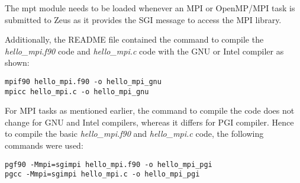 The mpt module needs to be loaded whenever an MPI or OpenMP/MPI task is submitted to Zeus as it provides the SGI message to access the MPI library.

Additionally, the README file contained the command to compile the \emph{hello\_mpi.f90} code and \emph{hello\_mpi.c} code with the 
GNU or Intel compiler as shown:

\begin{tcolorbox}
\begin{Verbatim}[fontsize=\scriptsize]
mpif90 hello_mpi.f90 -o hello_mpi_gnu
mpicc hello_mpi.c -o hello_mpi_gnu
\end{Verbatim}
\end{tcolorbox}

For MPI tasks as mentioned earlier, the command to compile the code does not change for GNU and Intel compilers, whereas it differs for PGI compiler.
Hence to compile the basic \emph{hello\_mpi.f90} and \emph{hello\_mpi.c} code, the following commands were used:

\begin{tcolorbox}
\begin{Verbatim}[fontsize=\scriptsize]
pgf90 -Mmpi=sgimpi hello_mpi.f90 -o hello_mpi_pgi
pgcc -Mmpi=sgimpi hello_mpi.c -o hello_mpi_pgi 
\end{Verbatim}
\end{tcolorbox}
